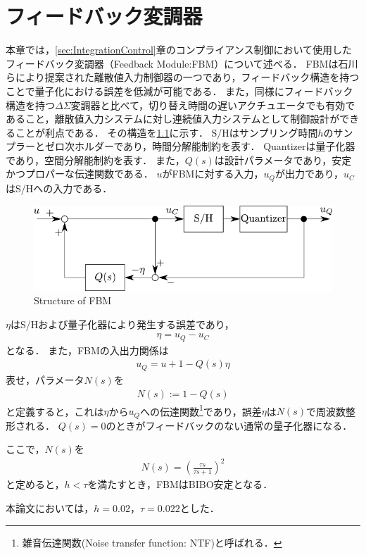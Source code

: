 \chapter{フィードバック変調器}
\label{sec:FBM}
本章では，\ref{sec:IntegrationControl}章のコンプライアンス制御において使用したフィードバック変調器（Feedback Module:FBM）について述べる．
FBMは石川らにより提案された離散値入力制御器の一つであり，フィードバック構造を持つことで量子化における誤差を低減が可能である\cite{石川将人2007,石川将人2008フィードバック変調器を用いた離散値入力制御におけるアクチュエータ非線形性の補償}．
また，同様にフィードバック構造を持つ$\Delta\Sigma$変調器と比べて，切り替え時間の遅いアクチュエータでも有効であること，離散値入力システムに対し連続値入力システムとして制御設計ができることが利点である．
その構造を\figname\ref{fig:FBM}に示す．
S/Hはサンプリング時間$h$のサンプラーとゼロ次ホルダーであり，時間分解能制約を表す．
Quantizerは量子化器であり，空間分解能制約を表す．
また，$Q(s)$は設計パラメータであり，安定かつプロパーな伝達関数である．
$u$がFBMに対する入力，$u_Q$が出力であり，$u_C$はS/Hへの入力である．

\begin{figure}[t]
    \centering
        \includegraphics[keepaspectratio, scale=1.0]{contents/Appendix_FBM/figure/FBM.pdf}
        \caption{Structure of FBM}
        \label{fig:FBM}
\end{figure}

$\eta$はS/Hおよび量子化器により発生する誤差であり，
\begin{align}
    \label{eq:FBM_eta}
    \eta = u_Q-u_C
\end{align}
となる．
また，FBMの入出力関係は
\begin{align}
    \label{eq:FBM_IO}
    u_Q = u + {1-Q(s)}\eta
\end{align}
表せ，パラメータ$N(s)$を
\begin{align}
    \label{eq:FBM_Ns}
    N(s) := 1-Q(s)
\end{align}
と定義すると，これは$\eta$から$u_Q$への伝達関数\footnote{雑音伝達関数(Noise transfer function: NTF)と呼ばれる．}であり，誤差$\eta$は$N(s)$で周波数整形される．
$Q(s)=0$のときがフィードバックのない通常の量子化器になる．

ここで，$N(s)$を
\begin{align}
    \label{eq:FBM_Ns2}
    N(s) = \left(\frac{\tau s}{\tau s + 1} \right)^2
\end{align}
と定めると，$h<\tau$を満たすとき，FBMはBIBO安定となる．

本論文においては，$h=0.02$，$\tau=0.022$とした．